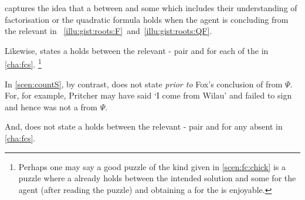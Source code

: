 \begin{note}
  \supportII{} captures the idea that a \fingfr{} between  and some \pool{} which includes their understanding of factorisation or the quadratic formula holds when the agent is concluding  from the relevant \pool{} in ~\ref{illu:gist:roots:F}~and~\ref{illu:gist:roots:QF}.

  Likewise, \supportII{} states a  holds between the relevant - pair and \pool{} for each of the  in \autoref{cha:fcs}.%
  \footnote{
    Perhaps one may say a good puzzle of the kind given in \autoref{scen:fc:chick} is a puzzle where a \fingfr{} already holds between the intended solution and some \pool{} for the agent (after reading the puzzle) and obtaining a \wit{} for the \fingfr{} is enjoyable.
  }

  In \autoref{scen:countS}, by contrast, \supportII{} does not state  \emph{prior to} Fox's conclusion of  from \(\Psi\).
  For, for example, Pritcher may have said `I come from Wilau' and failed to sign and hence  was not a \fc{} from \(\Psi\).

  And, \supportII{} does not state a \fingfr{} holds between the relevant - pair and \pool{} for any absent  in \autoref{cha:fcs}.
\end{note}


